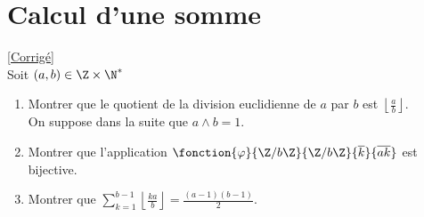 \documentclass[8pt]{book}
\begin{document}
\section{Calcul d'une somme }
\label{Calcul d'une somme}
\textcolor{blue}{\hyperref[Calcul d'une somme corrigé]{[Corrigé]}}\\
Soit $(a,b)\in \Z \times \N^*$
\begin{enumerate}
	\item Montrer que le quotient de la division euclidienne de $a$ par $b$ est $\displaystyle{\left\lfloor \frac{a}{b}\right\rfloor}$.\\
	On suppose dans la suite que $a\wedge b=1$.
	\item Montrer que l'application $\fonction{\varphi}{\Z/b\Z}{\Z/b\Z}{\overline k}{\overline{ak}}$ est bijective.
	\item Montrer que $\displaystyle\sum\limits_{k=1}^{b-1}{\left\lfloor \frac{ka}{b}\right\rfloor}=\frac{(a-1)(b-1)}{2}$.
\end{enumerate}
\end{document}

